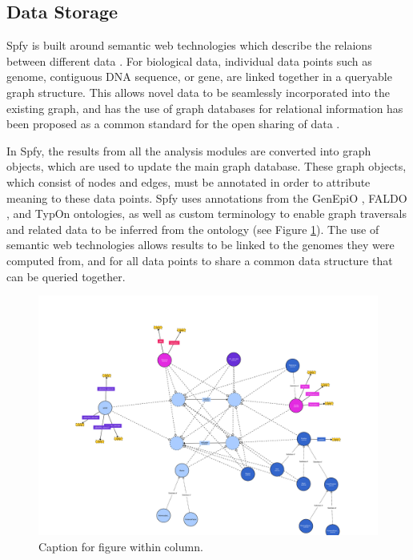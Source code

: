 \documentclass[a4,center,fleqn]{NAR}
\begin{document}
\subsection{Data Storage}
Spfy is built around semantic web technologies which describe the relaions between different data \cite{berners2001semantic}. For biological data, individual data points such as genome, contiguous DNA sequence, or gene, are linked together in a queryable graph structure. This allows novel data to be seamlessly incorporated into the existing graph, and has the use of graph databases for relational information has been proposed as a common standard for the open sharing of data \cite{horrocks2005semantic}.

In Spfy, the results from all the analysis modules are converted into graph objects, which are used to update the main graph database. These graph objects, which consist of nodes and edges, must be annotated in order to attribute meaning to these data points. Spfy uses annotations from the GenEpiO \cite{griffiths2017context}, FALDO \cite{bolleman2016faldo}, and TypOn \cite{vaz2014typon} ontologies, as well as custom terminology to enable graph traversals and related data to be inferred from the ontology (see Figure \ref{fig-ontology}). The use of semantic web technologies allows results to be linked to the genomes they were computed from, and for all data points to share a common data structure that can be queried together.

\begin{figure}[t]
\begin{center}
\includegraphics{images/spfy_ontology-1.svg}
\end{center}
\caption{Caption for figure within column.}
\label{fig-ontology}
\end{figure}
\end{document}
